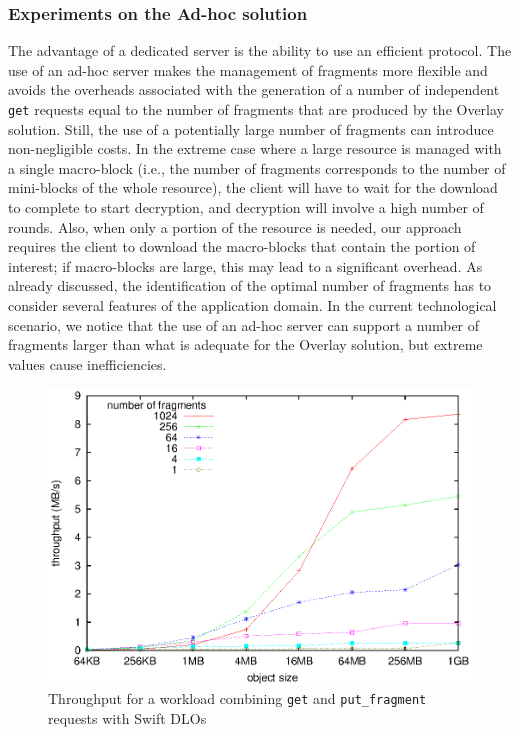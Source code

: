 \subsubsection{Experiments on the Ad-hoc solution}
The advantage of a dedicated server is the ability to use an efficient protocol. The use of an ad-hoc server makes the management of fragments more flexible and avoids the overheads associated with the generation of a number of independent {\tt get} requests equal to the number of fragments that are produced by the Overlay solution. Still, the use of a potentially large number of fragments can introduce non-negligible costs. In the extreme case where a large resource is managed with a single macro-block (i.e., the number of fragments corresponds to the number of mini-blocks of the whole resource), the client will have to wait for the download to complete to start decryption, and decryption will involve a high number of rounds. Also, when only a portion of the resource is needed, our approach requires the client to download the macro-blocks that contain the portion of interest; if macro-blocks are large, this may lead to a significant overhead. As already discussed, the identification of the optimal number of fragments has to consider several features of the application domain. In the current technological scenario, we notice that the use of an ad-hoc server can support a number of fragments larger than what is adequate for the Overlay solution, but extreme values cause inefficiencies.

\begin{figure}[t]
\centering
\includegraphics[width=0.8\columnwidth,valign=t]{figures/fig12}
\caption{\label{ms:fig:throughputDlo}Throughput for a workload combining {\tt get} and {\tt put\_fragment} requests with Swift DLOs}
\end{figure}

